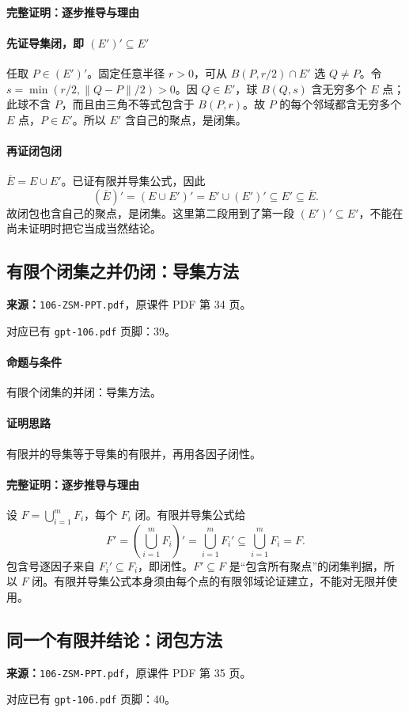 \paragraph{完整证明：逐步推导与理由}

\paragraph{先证导集闭，即 $(E')'\subseteq E'$}
任取 $P\in(E')'$。固定任意半径 $r>0$，可从 $B(P,r/2)\cap E'$ 选 $Q\ne P$。令 $s=\min(r/2,\|Q-P\|/2)>0$。因 $Q\in E'$，球 $B(Q,s)$ 含无穷多个 $E$ 点；此球不含 $P$，而且由三角不等式包含于 $B(P,r)$。故 $P$ 的每个邻域都含无穷多个 $E$ 点，$P\in E'$。所以 $E'$ 含自己的聚点，是闭集。
\paragraph{再证闭包闭}
$\overline E=E\cup E'$。已证有限并导集公式，因此
\[(\overline E)'=(E\cup E')'=E'\cup(E')'\subseteq E'\subseteq\overline E.\]
故闭包也含自己的聚点，是闭集。这里第二段用到了第一段 $(E')'\subseteq E'$，不能在尚未证明时把它当成当然结论。

\clearpage\subsection{有限个闭集之并仍闭：导集方法}
\textbf{来源：}\texttt{106-ZSM-PPT.pdf}，原课件 PDF 第 34 页。\par
对应已有 \texttt{gpt-106.pdf} 页脚：39。\par
\paragraph{命题与条件}有限个闭集的并闭：导集方法。
\paragraph{证明思路}有限并的导集等于导集的有限并，再用各因子闭性。
\paragraph{完整证明：逐步推导与理由}
设 $F=\bigcup_{i=1}^mF_i$，每个 $F_i$ 闭。有限并导集公式给
\[F'=\left(\bigcup_{i=1}^mF_i\right)'=\bigcup_{i=1}^mF_i'\subseteq\bigcup_{i=1}^mF_i=F.\]
包含号逐因子来自 $F_i'\subseteq F_i$，即闭性。$F'\subseteq F$ 是“包含所有聚点”的闭集判据，所以 $F$ 闭。有限并导集公式本身须由每个点的有限邻域论证建立，不能对无限并使用。
\clearpage\subsection{同一个有限并结论：闭包方法}
\textbf{来源：}\texttt{106-ZSM-PPT.pdf}，原课件 PDF 第 35 页。\par
对应已有 \texttt{gpt-106.pdf} 页脚：40。\par
